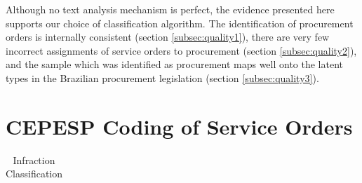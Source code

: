 \documentclass[11pt]{article}
\begin{document}
Although no text analysis mechanism is perfect, the evidence presented here supports our choice of classification algorithm. The identification of procurement orders is internally consistent (section \ref{subsec:quality1}), there are very few incorrect assignments of service orders to procurement (section \ref{subsec:quality2}), and the sample which was identified as procurement maps well onto the latent types in the Brazilian procurement legislation (section \ref{subsec:quality3}).

\section{CEPESP Coding of Service Orders}\label{sec:appendixB}

\begin{table}[!htbp]
  \caption{\label{tab:codes} Infraction Classification}
  \centering
  \scriptsize
  \begin{tabular}{r|l}
  \hline


\end{tabular}
\end{table}
\end{document}
